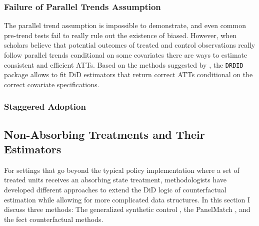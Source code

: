\documentclass[hidelinks]{article}\usepackage[]{graphicx}\usepackage[]{color}
\begin{document}
\subsubsection{Failure of Parallel Trends Assumption}

The parallel trend assumption is impossible to demonstrate, and even common pre-trend tests fail to really rule out the existence of biased. However, when scholars believe that potential outcomes of treated and control observations really follow parallel trends conditional on some covariates there are ways to estimate consistent and efficient ATTs. Based on the methods suggested by \textcite{SantAnna2020}, the \texttt{DRDID} package allows to fit DiD estimators that return correct ATTs conditional on the correct covariate specifications.

\subsubsection{Staggered Adoption}



\subsection{Non-Absorbing Treatments and Their Estimators}

For settings that go beyond the typical policy implementation where a set of treated units receives an absorbing state treatment, methodologists have developed different approaches to extend the DiD logic of counterfactual estimation while allowing for more complicated data structures. In this section I discuss three methods: The generalized synthetic control \parencite[GSCM]{Xu2017}, the PanelMatch \parencite{Imai2021, Kim2021}, and the fect \parencite{Liu} counterfactual methods.



\printbibliography
\end{document}
